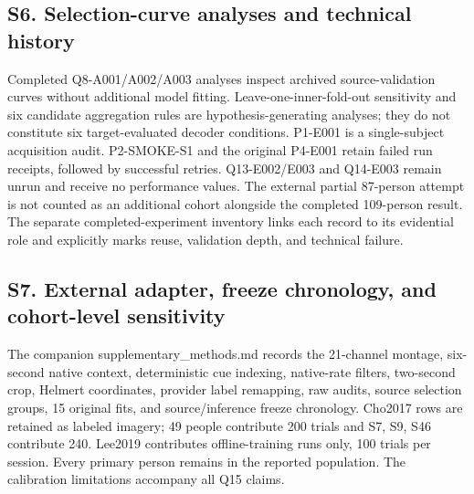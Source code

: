 \documentclass[11pt]{article}
\begin{document}
\subsection*{S6. Selection-curve analyses and technical history}
Completed Q8-A001/A002/A003 analyses inspect archived source-validation curves without additional model fitting. Leave-one-inner-fold-out sensitivity and six candidate aggregation rules are hypothesis-generating analyses; they do not constitute six target-evaluated decoder conditions. P1-E001 is a single-subject acquisition audit. P2-SMOKE-S1 and the original P4-E001 retain failed run receipts, followed by successful retries. Q13-E002/E003 and Q14-E003 remain unrun and receive no performance values. The external partial 87-person attempt is not counted as an additional cohort alongside the completed 109-person result. The separate completed-experiment inventory links each record to its evidential role and explicitly marks reuse, validation depth, and technical failure.

\subsection*{S7. External adapter, freeze chronology, and cohort-level sensitivity}
The companion supplementary\_methods.md records the 21-channel montage, six-second native context, deterministic cue indexing, native-rate filters, two-second crop, Helmert coordinates, provider label remapping, raw audits, source selection groups, 15 original fits, and source/inference freeze chronology. Cho2017 rows are retained as labeled imagery; 49 people contribute 200 trials and S7, S9, S46 contribute 240. Lee2019 contributes offline-training runs only, 100 trials per session. Every primary person remains in the reported population. The calibration limitations accompany all Q15 claims.
\end{document}
